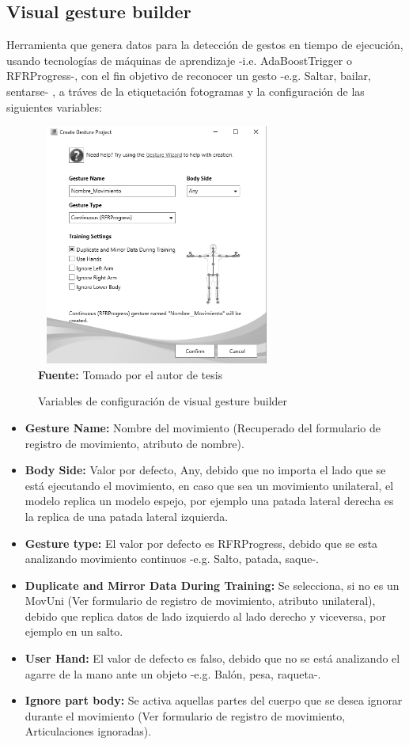 \subsection{Visual gesture builder} \label{ins:VisualGestureBuilder}
Herramienta que genera datos para la detecci\'on de gestos en tiempo de ejecuci\'on, usando tecnolog\'ias de m\'aquinas de aprendizaje -i.e. AdaBoostTrigger o RFRProgress-, con el fin objetivo de reconocer un gesto -e.g. Saltar, bailar, sentarse- \cite{KinectBuilder2019}, a tr\'aves de la etiquetaci\'on  fotogramas y la configuraci\'on de las siguientes variables:
 \begin{figure}[H]
	\caption{Variables de configuraci\'on de visual gesture builder}
	\label{fig:visualGesture}
	\centering
	\includegraphics[width=300px,height=300px]{graphics/settingsGesture.PNG} \\
	\textbf{Fuente:} Tomado por el autor de tesis
\end{figure} 
\begin{itemize}
\item \textbf{Gesture Name:} Nombre del movimiento  (Recuperado del formulario de registro de movimiento, atributo de nombre).
\item \textbf{Body Side:} Valor por defecto, Any, debido que no importa el lado que se est\'a ejecutando el movimiento, en caso que sea un movimiento unilateral, el modelo replica un modelo espejo, por ejemplo una patada lateral derecha es la replica de una patada lateral izquierda.
\item \textbf{Gesture type:} El valor por defecto es RFRProgress, debido que se esta analizando movimiento continuos -e.g. Salto, patada, saque-.
\item \textbf{Duplicate and Mirror Data During Training:} Se selecciona, si no es un \gls{MovUni} (Ver formulario de registro de movimiento, atributo unilateral), debido que replica datos de lado izquierdo al lado derecho y viceversa, por ejemplo en un salto.
\item \textbf{User Hand:} El valor de defecto es falso, debido que no se est\'a analizando el agarre de la mano ante un objeto -e.g. Bal\'on, pesa, raqueta-.
\item \textbf{Ignore part body:} Se activa aquellas partes del cuerpo que se desea ignorar durante el movimiento (Ver formulario de registro de movimiento, Articulaciones ignoradas).
\end{itemize}

